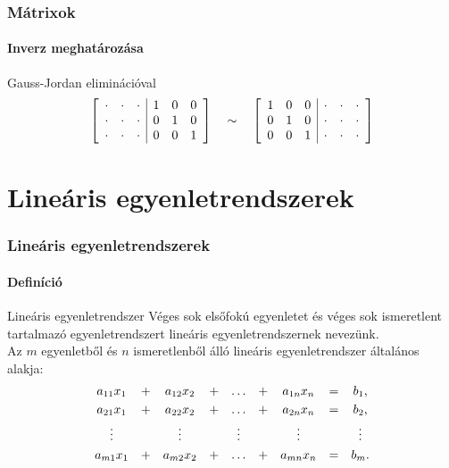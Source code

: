 \documentclass[xcolor={table}]{beamer}
\begin{document}
\begin{frame}
  \frametitle{Mátrixok}
  \framesubtitle{Inverz meghatározása}

  \vfill

  \begin{block}{Gauss-Jordan eliminációval}
    \[
      \left[\begin{array}{*{3}{>{\cdot}{c}}|*{3}c}
           &  &  & 1 & 0 & 0 \\
           &  &  & 0 & 1 & 0 \\
           &  &  & 0 & 0 & 1 \\
        \end{array}\right]
      \quad \sim \quad
      \left[\begin{array}{*{3}{c}|*{3}{>{\cdot}{c}}}
          1 & 0 & 0 &  &  & \\
          0 & 1 & 0 &  &  & \\
          0 & 0 & 1 &  &  & \\
        \end{array}\right]
    \]
  \end{block}

  \vfill

  

  \vfill
\end{frame}

\section{Lineáris egyenletrendszerek}
\begin{frame}
  \frametitle{Lineáris egyenletrendszerek}
  \framesubtitle{Definíció}

  \begin{block}{Lineáris egyenletrendszer}
    Véges sok elsőfokú egyenletet és véges sok ismeretlent tartalmazó
    egyenletrendszert lineáris egyenletrendszernek nevezünk.
    \\[2mm]
    Az $m$ egyenletből és $n$ ismeretlenből álló lineáris egyenletrendszer
    általános alakja:
    \[
      \begin{array}{*{9}{c}}
        a_{11} x_{1} & + & a_{12} x_{2} & + & \dots  & + & a_{1n} x_{n} & = & b_{1}\text, \\[1mm]
        a_{21} x_{1} & + & a_{22} x_{2} & + & \dots  & + & a_{2n} x_{n} & = & b_{2}\text, \\[1mm]
        \vdots       &   & \vdots       &   & \vdots &   & \vdots       &   & \vdots      \\[1mm]
        a_{m1} x_{1} & + & a_{m2} x_{2} & + & \dots  & + & a_{mn} x_{n} & = & b_{m}\text.
      \end{array}
    \]
  \end{block}
\end{frame}
\end{document}

